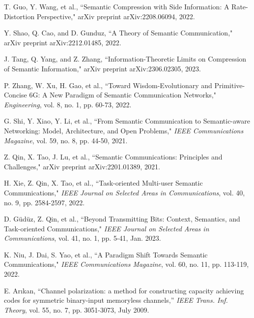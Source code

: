\documentclass[12pt, draftclsnofoot,onecolumn]{IEEEtran}
\begin{document}
\begin{thebibliography}{99}
T. Guo, Y. Wang, et al., ``Semantic Compression with Side Information: A Rate-Distortion Perspective," arXiv preprint arXiv:2208.06094, 2022.

Y. Shao, Q. Cao, and D. Gunduz, ``A Theory of Semantic Communication," arXiv preprint arXiv:2212.01485, 2022.

J. Tang, Q. Yang, and Z. Zhang, ``Information-Theoretic Limits on Compression of Semantic Information," arXiv preprint arXiv:2306.02305, 2023.

P. Zhang, W. Xu, H. Gao, et al., ``Toward Wisdom-Evolutionary and Primitive-Concise 6G: A New Paradigm of Semantic Communication Networks," \emph{Engineering}, vol. 8, no. 1, pp. 60-73, 2022.

G. Shi, Y. Xiao, Y. Li, et al., ``From Semantic Communication to Semantic-aware Networking: Model, Architecture, and Open Problems," \emph{IEEE Communications Magazine}, vol. 59, no. 8, pp. 44-50, 2021.

Z. Qin, X. Tao, J. Lu, et al., ``Semantic Communications: Principles and Challenges," arXiv preprint arXiv:2201.01389, 2021.

H. Xie, Z. Qin, X. Tao, et al., ``Task-oriented Multi-user Semantic Communications," \emph{IEEE Journal on Selected Areas in Communications}, vol. 40, no. 9, pp. 2584-2597, 2022.

D. G\"ud\"uz, Z. Qin, et al., ``Beyond Transmitting Bits: Context, Semantics, and Task-oriented Communications," \emph{IEEE Journal on Selected Areas in Communications}, vol. 41, no. 1, pp. 5-41, Jan. 2023.

K. Niu, J. Dai, S. Yao, et al., ``A Paradigm Shift Towards Semantic Communications," \emph{IEEE Communications Magazine}, vol. 60, no. 11, pp. 113-119, 2022.

E. Ar{\i}kan, ``Channel polarization: a method for constructing capacity achieving codes for symmetric binary-input memoryless channels,'' \emph{IEEE Trans. Inf. Theory}, vol. 55, no. 7, pp. 3051-3073, July 2009.

\end{thebibliography}

\end{document}
